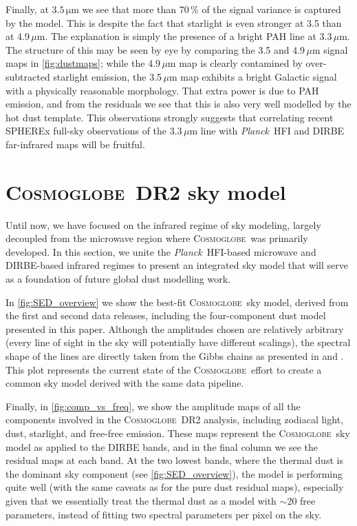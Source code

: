 \documentclass{aa}
\def\Cosmoglobe{\textsc{Cosmoglobe}}
\def\Planck{\textit{Planck}}
\begin{document}
Finally, at $3.5\,\mathrm{\mu m}$ we see that more than 70\,\% of the signal variance is captured by the model. This is despite the fact that starlight is even stronger at 3.5 than at 4.9\,$\mu$m. The explanation is simply the presence of a bright PAH line at 3.3\,$\mu$m. The structure of this may be seen by eye by comparing the 3.5 and 4.9\,$\mu$m signal maps in \cref{fig:dustmaps}; while the 4.9\,$\mu$m map is clearly contamined by over-subtracted starlight emission, the 3.5\,$\mu$m map exhibits a bright Galactic signal with a physically reasonable morphology. That extra power is due to PAH emission, and from the residuals we see that this is also very well modelled by the hot dust template. This observations strongly suggests that correlating recent SPHEREx full-sky observations of the 3.3\,$\mu$m line with \Planck\ HFI and DIRBE far-infrared maps will be fruitful.



\section{\Cosmoglobe\ DR2 sky model}
\label{sec:dr2_skymodel}

Until now, we have focused on the infrared regime of sky modeling,
largely decoupled from the microwave region where \Cosmoglobe\ was
primarily developed.  In this section, we unite the \Planck\ HFI-based
microwave and DIRBE-based infrared regimes to present an integrated
sky model that will serve as a foundation of future global dust
modelling work.


In \cref{fig:SED_overview} we show the best-fit \Cosmoglobe\ sky model,
derived from the first and second data releases,
including the four-component dust model presented in this paper. Although the
amplitudes chosen are relatively arbitrary (every line of sight in the sky will
potentially have different scalings), the spectral shape of the lines are
directly taken from the Gibbs chains as presented in \citet{watts2023_dr1} and
\citet{CG02_01}. This plot represents the current state of the \Cosmoglobe\
effort to create a common sky model derived with the same data pipeline.





Finally, in \cref{fig:comp_vs_freq}, we show the amplitude maps of all the
components involved in the \Cosmoglobe\ DR2 analysis, including zodiacal light,
dust, starlight, and free-free emission. These maps represent the \Cosmoglobe\
sky model as applied to the DIRBE bands, and in the final column we see the
residual maps at each band. At the two lowest bands, where the thermal dust is
the dominant sky component (see \cref{fig:SED_overview}), the model is
performing quite well (with the same caveats as for the pure dust residual
maps), especially given that we essentially treat the thermal dust as a model
with $\sim$20 free parameters, instead of fitting two spectral parameters per
pixel on the sky.
\end{document}
